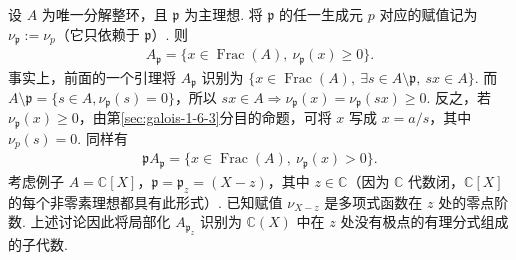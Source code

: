 \begin{example*}
设 $A$ 为唯一分解整环，且 $\mathfrak p$ 为主理想. 将 $\mathfrak p$ 的任一生成元 $p$ 对应的赋值记为 $\nu_{\mathfrak p}:=\nu_p$（它只依赖于 $\mathfrak p$）. 则
\begin{align*}
A_{\mathfrak p}=\{x\in\operatorname{Frac}(A),\ \nu_{\mathfrak p}(x)\geqslant0\}.
\end{align*}
事实上，前面的一个引理将 $A_{\mathfrak p}$ 识别为 $\{x\in\operatorname{Frac}(A),\ \exists s\in A\setminus\mathfrak p,\ sx\in A\}$. 而 $A\setminus\mathfrak p=\{s\in A,\nu_{\mathfrak p}(s)=0\}$，所以 $sx\in A\Rightarrow\nu_{\mathfrak p}(x)=\nu_{\mathfrak p}(sx)\geqslant0$. 反之，若 $\nu_{\mathfrak p}(x)\geqslant0$，由第\ref{sec:galois-1-6-3}分目的命题，可将 $x$ 写成 $x=a/s$，其中 $\nu_p(s)=0$. 同样有
\begin{align*}
\mathfrak pA_{\mathfrak p}=\{x\in\operatorname{Frac}(A),\ \nu_{\mathfrak p}(x)>0\}.
\end{align*}
考虑例子 $A=\mathbb C[X]$，$\mathfrak p=\mathfrak p_z=(X-z)$，其中 $z\in\mathbb C$（因为 $\mathbb C$ 代数闭，$\mathbb C[X]$ 的每个非零素理想都具有此形式）. 已知赋值 $\nu_{X-z}$ 是多项式函数在 $z$ 处的零点阶数. 上述讨论因此将局部化 $A_{\mathfrak p_z}$ 识别为 $\mathbb C(X)$ 中在 $z$ 处没有极点的有理分式组成的子代数.
\end{example*}
